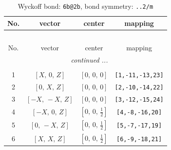 \documentclass[fleqn,8pt]{jsarticle}
\begin{document}
\begin{longtable}{cccc}
\caption{Wyckoff bond: {\tt 6b@2b}, bond symmetry: {\tt ..2/m}}
 \\
 \hline \hline
No. & vector & center & mapping \\ \hline \endfirsthead

\multicolumn{3}{l}{\tablename\ \thetable{}} \\
 \hline \hline
No. & vector & center & mapping \\ \hline \endhead

 \hline \hline
\multicolumn{3}{r}{\footnotesize\it continued ...} \\ \endfoot

 \hline \hline
\multicolumn{3}{r}{} \\ \endlastfoot

1 & $\left[ X,\, 0,\, Z \right]$ & $\left[ 0,\, 0,\, 0 \right]$ & {\tt [1,-11,-13,23]} \\ \hline
2 & $\left[ 0,\, X,\, Z \right]$ & $\left[ 0,\, 0,\, 0 \right]$ & {\tt [2,-10,-14,22]} \\ \hline
3 & $\left[ - X,\, - X,\, Z \right]$ & $\left[ 0,\, 0,\, 0 \right]$ & {\tt [3,-12,-15,24]} \\ \hline
4 & $\left[ - X,\, 0,\, Z \right]$ & $\left[ 0,\, 0,\, \frac{1}{2} \right]$ & {\tt [4,-8,-16,20]} \\ \hline
5 & $\left[ 0,\, - X,\, Z \right]$ & $\left[ 0,\, 0,\, \frac{1}{2} \right]$ & {\tt [5,-7,-17,19]} \\ \hline
6 & $\left[ X,\, X,\, Z \right]$ & $\left[ 0,\, 0,\, \frac{1}{2} \right]$ & {\tt [6,-9,-18,21]} \\
\end{longtable}
\renewcommand{\arraystretch}{1.2}
\end{document}
